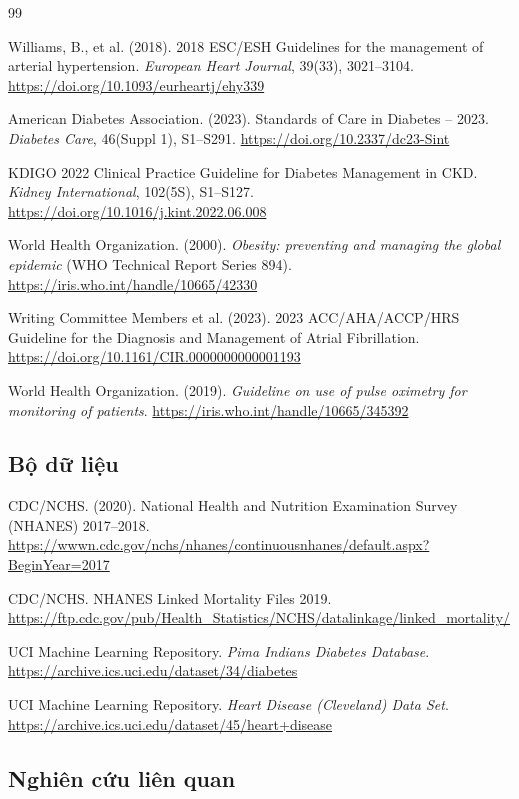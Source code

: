 \documentclass[13pt,a4paper]{article}
\begin{document}
\begin{thebibliography}{99}

Williams, B., et al. (2018). 2018 ESC/ESH Guidelines for the management of arterial hypertension. \textit{European Heart Journal}, 39(33), 3021--3104. \url{https://doi.org/10.1093/eurheartj/ehy339}

American Diabetes Association. (2023). Standards of Care in Diabetes -- 2023. \textit{Diabetes Care}, 46(Suppl 1), S1--S291. \url{https://doi.org/10.2337/dc23-Sint}

KDIGO 2022 Clinical Practice Guideline for Diabetes Management in CKD. \textit{Kidney International}, 102(5S), S1--S127. \url{https://doi.org/10.1016/j.kint.2022.06.008}

World Health Organization. (2000). \textit{Obesity: preventing and managing the global epidemic} (WHO Technical Report Series 894). \url{https://iris.who.int/handle/10665/42330}

Writing Committee Members et al. (2023). 2023 ACC/AHA/ACCP/HRS Guideline for the Diagnosis and Management of Atrial Fibrillation. \url{https://doi.org/10.1161/CIR.0000000000001193}

World Health Organization. (2019). \textit{Guideline on use of pulse oximetry for monitoring of patients}. \url{https://iris.who.int/handle/10665/345392}

\subsection{Bộ dữ liệu}

CDC/NCHS. (2020). National Health and Nutrition Examination Survey (NHANES) 2017--2018. \url{https://wwwn.cdc.gov/nchs/nhanes/continuousnhanes/default.aspx?BeginYear=2017}

CDC/NCHS. NHANES Linked Mortality Files 2019. \url{https://ftp.cdc.gov/pub/Health_Statistics/NCHS/datalinkage/linked_mortality/}

UCI Machine Learning Repository. \textit{Pima Indians Diabetes Database}. \url{https://archive.ics.uci.edu/dataset/34/diabetes}

UCI Machine Learning Repository. \textit{Heart Disease (Cleveland) Data Set}. \url{https://archive.ics.uci.edu/dataset/45/heart+disease}

\subsection{Nghiên cứu liên quan}


\end{thebibliography}
\end{document}
